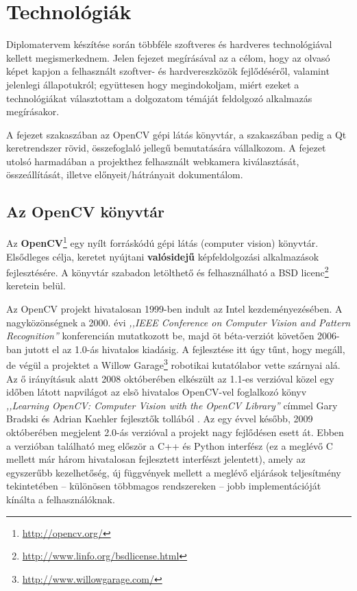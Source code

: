 \chapter{Technológiák}\label{sect:technológia}

Diplomatervem készítése során többféle szoftveres és hardveres technológiával kellett megismerkednem. Jelen fejezet megírásával az a célom, hogy az olvasó képet kapjon a felhasznált szoftver- és hardvereszközök fejlődéséről, valamint jelenlegi állapotukról; együttesen hogy megindokoljam, miért ezeket a technológiákat választottam a dolgozatom témáját feldolgozó alkalmazás megírásakor.

\bigskip

A fejezet  szakaszában az OpenCV gépi látás könyvtár, a  szakaszában pedig a Qt keretrendszer rövid, összefoglaló jellegű bemutatására vállalkozom. A fejezet utolsó harmadában a projekthez felhasznált webkamera kiválasztását, összeállítását, illetve előnyeit/hátrányait dokumentálom. 

\section{Az OpenCV könyvtár}\label{sect:opencv}

Az \textbf{OpenCV}\footnote{\url{http://opencv.org/}} egy nyílt forráskódú gépi látás (computer vision) könyvtár. Elsődleges célja, keretet nyújtani \textbf{valósidejű} képfeldolgozási alkalmazások fejlesztésére. A könyvtár szabadon letölthető és felhasználható a BSD licenc\footnote{\url{http://www.linfo.org/bsdlicense.html}} keretein belül. \cite{opencv_wiki}

\bigskip

Az OpenCV projekt hivatalosan 1999-ben indult az Intel kezdeményezésében. A nagyközönségnek a 2000. évi \textit{,,IEEE Conference on Computer Vision and Pattern Recognition''} konferencián mutatkozott be, majd öt béta-verziót követően 2006-ban jutott el az 1.0-ás hivatalos kiadásig. A fejlesztése itt úgy tűnt, hogy megáll, de végül a projektet a Willow Garage\footnote{\url{http://www.willowgarage.com/}} robotikai kutatólabor vette szárnyai alá. Az ő irányításuk alatt 2008 októberében elkészült az 1.1-es verzióval közel egy időben látott napvilágot az elsõ hivatalos OpenCV-vel foglalkozó könyv \textit{,,Learning OpenCV: Computer Vision with the OpenCV Library''} címmel Gary Bradski és Adrian Kaehler fejlesztők tollából \cite{opencv_book}. Az egy évvel később, 2009 októberében megjelent 2.0-ás verzióval a projekt nagy fejlődésen esett át. Ebben a verzióban található meg először a C++ és Python interfész (ez a meglévő C mellett már három hivatalosan fejlesztett interfészt jelentett), amely az egyszerűbb kezelhetőség, új függvények mellett a meglévő eljárások teljesítmény tekintetében -- különösen többmagos rendszereken -- jobb implementációját kínálta a felhasználóknak.

